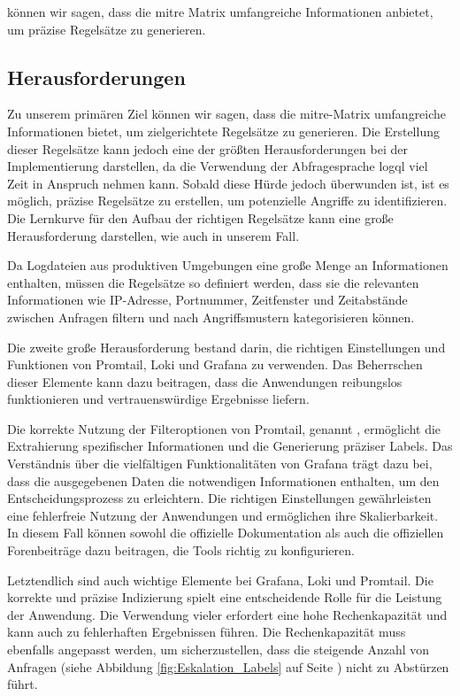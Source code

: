 können wir sagen, dass die \gls{mitre} Matrix umfangreiche Informationen anbietet, um präzise Regelsätze zu generieren. 

\subsection{Herausforderungen}
Zu unserem primären Ziel können wir sagen, dass die \gls{mitre}-Matrix umfangreiche Informationen bietet, um zielgerichtete Regelsätze zu generieren. Die Erstellung dieser Regelsätze kann jedoch eine der größten Herausforderungen bei der Implementierung darstellen, da die Verwendung der Abfragesprache \gls{logql} viel Zeit in Anspruch nehmen kann. Sobald diese Hürde jedoch überwunden ist, ist es möglich, präzise Regelsätze zu erstellen, um potenzielle Angriffe zu identifizieren. Die Lernkurve für den Aufbau der richtigen Regelsätze kann eine große Herausforderung darstellen, wie auch in unserem Fall.

Da Logdateien aus produktiven Umgebungen eine große Menge an Informationen enthalten, müssen die Regelsätze so definiert werden, dass sie die relevanten Informationen wie IP-Adresse, Portnummer, Zeitfenster und Zeitabstände zwischen Anfragen filtern und nach Angriffsmustern kategorisieren können.

Die zweite große Herausforderung bestand darin, die richtigen Einstellungen und Funktionen von Promtail, Loki und Grafana zu verwenden. Das Beherrschen dieser Elemente kann dazu beitragen, dass die Anwendungen reibungslos funktionieren und vertrauenswürdige Ergebnisse liefern.

Die korrekte Nutzung der Filteroptionen von Promtail, genannt , ermöglicht die Extrahierung spezifischer Informationen und die Generierung präziser Labels. Das Verständnis über die vielfältigen Funktionalitäten von Grafana trägt dazu bei, dass die ausgegebenen Daten die notwendigen Informationen enthalten, um den Entscheidungsprozess zu erleichtern. Die richtigen Einstellungen gewährleisten eine fehlerfreie Nutzung der Anwendungen und ermöglichen ihre Skalierbarkeit. In diesem Fall können sowohl die offizielle Dokumentation als auch die offiziellen Forenbeiträge dazu beitragen, die Tools richtig zu konfigurieren.

Letztendlich sind  auch wichtige Elemente bei Grafana, Loki und Promtail. Die korrekte und präzise Indizierung spielt eine entscheidende Rolle für die Leistung der Anwendung. Die Verwendung vieler  erfordert eine hohe Rechenkapazität und kann auch zu fehlerhaften Ergebnissen führen. Die Rechenkapazität muss ebenfalls angepasst werden, um sicherzustellen, dass die steigende Anzahl von Anfragen (siehe Abbildung \ref{fig:Eskalation_Labels} auf Seite \pageref{fig:Eskalation_Labels}) nicht zu Abstürzen führt.


